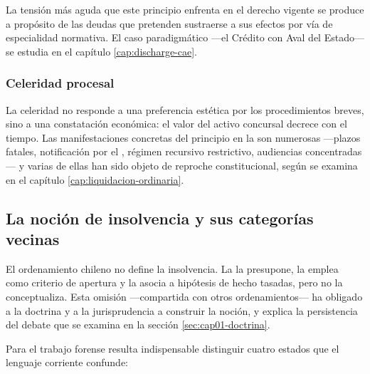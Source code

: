 La tensión más aguda que este principio enfrenta en el derecho vigente se produce a
propósito de las deudas que pretenden sustraerse a sus efectos por vía de especialidad
normativa. El caso paradigmático ---el Crédito con Aval del Estado--- se estudia en el
capítulo \ref{cap:discharge-cae}.

\subsubsection{Celeridad procesal}

La celeridad no responde a una preferencia estética por los procedimientos breves, sino a
una constatación económica: el valor del activo concursal decrece con el tiempo. Las
manifestaciones concretas del principio en la \LIR{} son numerosas ---plazos fatales,
notificación por el \boletin{}, régimen recursivo restrictivo, audiencias concentradas---
y varias de ellas han sido objeto de reproche constitucional, según se examina en el
capítulo \ref{cap:liquidacion-ordinaria}.

\subsection{La noción de insolvencia y sus categorías vecinas}

El ordenamiento chileno no define la insolvencia. La \LIR{} \citeyearpar{ley-20720} la
presupone, la emplea como criterio de apertura y la asocia a hipótesis de hecho tasadas, pero no la conceptualiza.
Esta omisión ---compartida con otros ordenamientos--- ha obligado a la doctrina y a la
jurisprudencia a construir la noción, y explica la persistencia del debate que se examina
en la sección \ref{sec:cap01-doctrina}.

Para el trabajo forense resulta indispensable distinguir cuatro estados que el lenguaje
corriente confunde:

